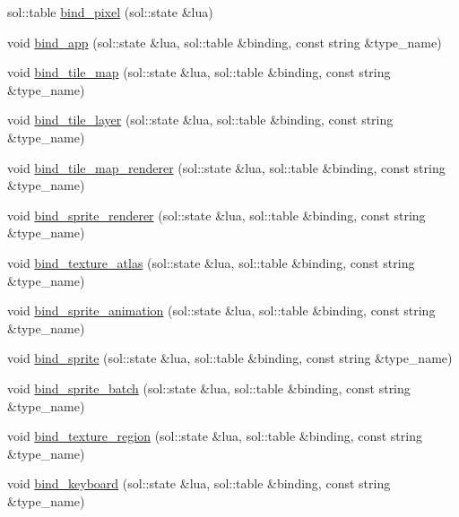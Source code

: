 \begin{DoxyCompactItemize}
\item 
sol\+::table \hyperlink{namespacepixel_1_1binding_ab272e0e67cf55a0e247549bb29b1deda}{bind\+\_\+pixel} (sol\+::state \&lua)
\item 
void \hyperlink{namespacepixel_1_1binding_a3d31a63c2925c5124d5d56a564d21d74}{bind\+\_\+app} (sol\+::state \&lua, sol\+::table \&binding, const string \&type\+\_\+name)
\item 
void \hyperlink{namespacepixel_1_1binding_a2e196ac7c3331bd6d70bf4832fe3e0a4}{bind\+\_\+tile\+\_\+map} (sol\+::state \&lua, sol\+::table \&binding, const string \&type\+\_\+name)
\item 
void \hyperlink{namespacepixel_1_1binding_a0ef36fda30c27f9e76a812a0eb2b0462}{bind\+\_\+tile\+\_\+layer} (sol\+::state \&lua, sol\+::table \&binding, const string \&type\+\_\+name)
\item 
void \hyperlink{namespacepixel_1_1binding_a2cb37d36e82884138762de826c9160cd}{bind\+\_\+tile\+\_\+map\+\_\+renderer} (sol\+::state \&lua, sol\+::table \&binding, const string \&type\+\_\+name)
\item 
void \hyperlink{namespacepixel_1_1binding_abcf205a5df34f7732e65716c10c56b45}{bind\+\_\+sprite\+\_\+renderer} (sol\+::state \&lua, sol\+::table \&binding, const string \&type\+\_\+name)
\item 
void \hyperlink{namespacepixel_1_1binding_abb52911bc71cd248f5aa1f1749f850fe}{bind\+\_\+texture\+\_\+atlas} (sol\+::state \&lua, sol\+::table \&binding, const string \&type\+\_\+name)
\item 
void \hyperlink{namespacepixel_1_1binding_a37d5dbd00ccd535932c8f2c43146ab2f}{bind\+\_\+sprite\+\_\+animation} (sol\+::state \&lua, sol\+::table \&binding, const string \&type\+\_\+name)
\item 
void \hyperlink{namespacepixel_1_1binding_a71a96e382c301a5b48e0ff142a6ebb35}{bind\+\_\+sprite} (sol\+::state \&lua, sol\+::table \&binding, const string \&type\+\_\+name)
\item 
void \hyperlink{namespacepixel_1_1binding_a1ad54a40f2ea5aa27a8dd3a173ae1c18}{bind\+\_\+sprite\+\_\+batch} (sol\+::state \&lua, sol\+::table \&binding, const string \&type\+\_\+name)
\item 
void \hyperlink{namespacepixel_1_1binding_a2e79543c93630c2c32b2defd8ce6d90c}{bind\+\_\+texture\+\_\+region} (sol\+::state \&lua, sol\+::table \&binding, const string \&type\+\_\+name)
\item 
void \hyperlink{namespacepixel_1_1binding_a8710271205036eb70d213b0a81b9ce48}{bind\+\_\+keyboard} (sol\+::state \&lua, sol\+::table \&binding, const string \&type\+\_\+name)

\end{DoxyCompactItemize}
